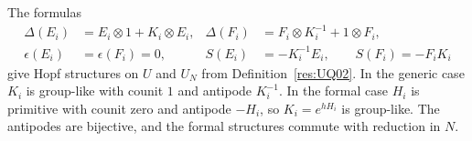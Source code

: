 \begin{theorem}
\label{res:UQ06}
The formulas
\[
\begin{aligned}
 \Delta(E_i)&=E_i\otimes1+K_i\otimes E_i, &
 \Delta(F_i)&=F_i\otimes K_i^{-1}+1\otimes F_i,\\
 \epsilon(E_i)&=\epsilon(F_i)=0, &
 S(E_i)&=-K_i^{-1}E_i,\qquad S(F_i)=-F_iK_i
\end{aligned}
\]
give Hopf structures on \(U\) and \(U_N\) from
Definition~\ref{res:UQ02}. In the generic case \(K_i\)
is group-like with counit \(1\) and antipode \(K_i^{-1}\).
In the formal case \(H_i\) is primitive with counit
zero and antipode \(-H_i\), so \(K_i=e^{hH_i}\) is
group-like. The antipodes are bijective, and the formal
structures commute with reduction in \(N\).
\end{theorem}
